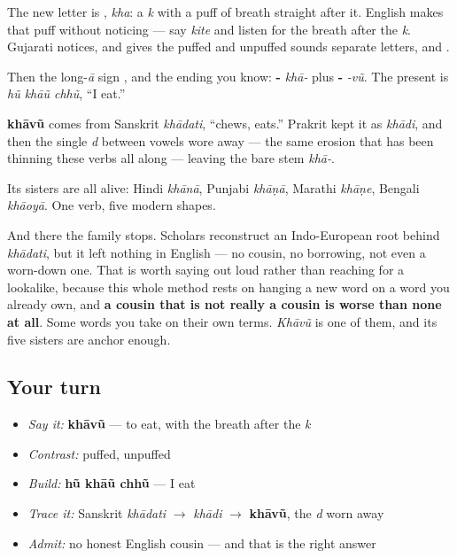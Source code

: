 The new letter is \textbf{}, \emph{kha}: a \emph{k} with a puff of breath straight after it. English makes that puff without noticing — say \emph{kite} and listen for the breath after the \emph{k}. Gujarati notices, and gives the puffed and unpuffed sounds separate letters, \textbf{} and \textbf{}.

Then the long-\emph{ā} sign \textbf{}, and the ending you know: \textbf{-} \emph{khā-} plus \textbf{-} \emph{-vũ}. The present is \emph{hũ khāũ chhũ}, \textquotedblleft{}I eat.\textquotedblright{}

\begin{cousinweb}
\textbf{khāvũ} comes from Sanskrit \emph{khādati}, \textquotedblleft{}chews, eats.\textquotedblright{} Prakrit kept it as \emph{khādi}, and then the single \emph{d} between vowels wore away — the same erosion that has been thinning these verbs all along — leaving the bare stem \emph{khā-}.

Its sisters are all alive: Hindi \emph{khānā}, Punjabi \emph{khāṇā}, Marathi \emph{khāṇe}, Bengali \emph{khāoyā}. One verb, five modern shapes.

And there the family stops. Scholars reconstruct an Indo-European root behind \emph{khādati}, but it left nothing in English — no cousin, no borrowing, not even a worn-down one. That is worth saying out loud rather than reaching for a lookalike, because this whole method rests on hanging a new word on a word you already own, and \textbf{a cousin that is not really a cousin is worse than none at all}. Some words you take on their own terms. \emph{Khāvũ} is one of them, and its five sisters are anchor enough.
\end{cousinweb}

\subsection*{Your turn}
\begin{itemize}
\raggedright
  \item \emph{Say it:} \textbf{khāvũ} — to eat, with the breath after the \emph{k}
  \item \emph{Contrast:} \textbf{} puffed, \textbf{} unpuffed
  \item \emph{Build:} \textbf{hũ khāũ chhũ} — I eat
  \item \emph{Trace it:} Sanskrit \emph{khādati} $\to$ \emph{khādi} $\to$ \textbf{khāvũ}, the \emph{d} worn away
  \item \emph{Admit:} no honest English cousin — and that is the right answer
\end{itemize}

